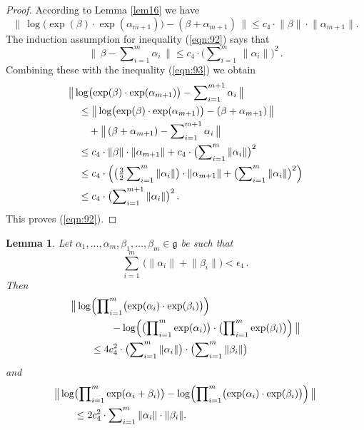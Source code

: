 \documentclass[10pt, a4paper]{amsart}
\newtheorem{lem}[equation]{Lemma}
\theoremstyle{definition}
\numberwithin{equation}{section}
\newcommand{\opn}{\operatorname}
\newcommand{\mfrak}[1]{\mathfrak{#1}}
\newcommand{\smfrac}[2]{{\textstyle \frac{#1}{#2}}}
\newcommand{\norm}[1]{\lVert #1 \rVert}
\newcommand{\Norm}[1]{\bigl\lVert\, #1 \, \bigr\rVert}
\newcommand{\g}{\mfrak{g}}
\begin{document}
\begin{proof}
According to Lemma \ref{lem16} we have
\[ \Norm{ \opn{log} \bigl( \opn{exp}(\beta) \cdot
\opn{exp}(\alpha_{m+1}) 
\bigr) - (\beta + \alpha_{m+1}) } \leq 
c_4 \cdot \norm{\beta} \cdot \norm{\alpha_{m+1}} . \]
The induction assumption for inequality (\ref{eqn:92}) says that
\[ \Norm{ \beta - \sum\nolimits_{i=1}^m \alpha_i } \leq 
c_4 \cdot \bigl( \sum\nolimits_{i = 1}^m\, \norm{\alpha_i} \bigr)^2 \, . \]
Combining these with the inequality (\ref{eqn:93}) we obtain
\[ \begin{aligned}
& \Norm{ \opn{log} \bigl( \opn{exp}(\beta) \cdot
\opn{exp}(\alpha_{m+1}) 
\bigr) -  \sum\nolimits_{i=1}^{m+1} \alpha_i } \\
& \quad \leq 
\Norm{ \opn{log} \bigl( \opn{exp}(\beta) \cdot
\opn{exp}(\alpha_{m+1}) 
\bigr) - (\beta + \alpha_{m+1}) } \\
& \quad \quad +
\Norm{ (\beta + \alpha_{m+1}) - \sum\nolimits_{i=1}^{m+1} \alpha_i } \\
& \quad \leq c_4 \cdot \norm{\beta} \cdot \norm{\alpha_{m+1}} +
c_4 \cdot \bigl( \sum\nolimits_{i = 1}^m\, \norm{\alpha_i} \bigr)^2 \\
& \quad \leq c_4 \cdot \Bigl(
\bigl( \smfrac{3}{2} \sum\nolimits_{i = 1}^m\, \norm{\alpha_i} \bigr)
\cdot \norm{\alpha_{m+1}} + 
\bigl( \sum\nolimits_{i = 1}^m\, \norm{\alpha_i} \bigr)^2 \Bigr)  \\
& \quad \leq c_4 \cdot 
\bigl( \sum\nolimits_{i = 1}^{m+1}\, \norm{\alpha_i} \bigr)^2 \, .
\end{aligned} \]
This proves (\ref{eqn:92}).
\end{proof}

\begin{lem} \label{lem18}
Let 
$\alpha_1, \ldots, \alpha_m, \beta_1, \ldots, \beta_m \in \g$ be
such that
\[ \sum_{i = 1}^m\, \bigl( \norm{\alpha_i} + \norm{\beta_i} \bigr)
< \epsilon_4 \, . \]
Then
\[ \begin{aligned}
& \Norm{ \opn{log} \Bigl( \prod\nolimits_{i=1}^m
\bigl( \exp(\alpha_i) \cdot \exp(\beta_i) \bigr) \Bigr) \\
& \qquad \qquad -
\opn{log} \Bigl( \bigl( \prod\nolimits_{i=1}^m \opn{exp}(\alpha_i)
\bigr)
\cdot \bigl( \prod\nolimits_{i=1}^m \opn{exp}(\beta_i) \bigr) \Bigr) }
\\
& \qquad \leq 4 c_4^2 \cdot 
\bigl( \sum\nolimits_{i = 1}^m\, \norm{\alpha_i} \bigr) \cdot  
\bigl( \sum\nolimits_{i = 1}^m\, \norm{\beta_i} \bigr) 
\end{aligned} \]
and
\[ \begin{aligned}
& \Norm{ \opn{log} \bigl( \prod\nolimits_{i=1}^m
\opn{exp}(\alpha_i + \beta_i) \bigr) -
\opn{log} \Bigl( \prod\nolimits_{i=1}^m
\bigl( \exp(\alpha_i) \cdot \exp(\beta_i) \bigr) \Bigr) } \\
& \qquad \leq 2 c_4^2 \cdot \sum\nolimits_{i = 1}^m\, 
\norm{\alpha_i} \cdot \norm{\beta_i} .
\end{aligned} \]
\end{lem}
\end{document}
